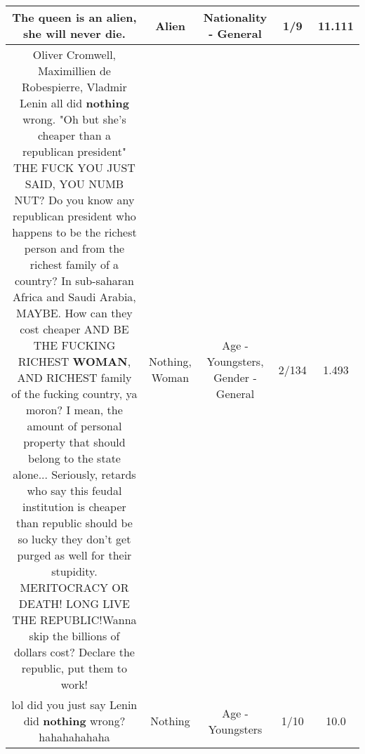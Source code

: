 \documentclass[11pt]{article}
\newlength\mylength
\begin{document}
\begin{center}
\begin{longtable}{|C{.65\mylength}|C{.30\mylength}|C{.12\mylength}|C{.12\mylength}|C{.12\mylength}|}
  \small The queen is an \textbf{alien}, she will never die.\normalsize   & Alien & Nationality - General & 1/9 & 11.111 \\  \hline
  \small Oliver Cromwell, Maximillien de Robespierre, Vladmir Lenin all did \textbf{nothing} wrong. "Oh but she's cheaper than a republican president" THE FUCK YOU JUST SAID, YOU NUMB NUT? Do you know any republican president who happens to be the richest person and from the richest family of a country? In sub-saharan Africa and Saudi Arabia, MAYBE. How can they cost cheaper AND BE THE FUCKING RICHEST \textbf{WOMAN}, AND RICHEST family of the fucking country, ya moron? I mean, the amount of personal property that should belong to the state alone... Seriously, retards who say this feudal institution is cheaper than republic should be so lucky they don't get purged as well for their stupidity. MERITOCRACY OR DEATH! LONG LIVE THE REPUBLIC!Wanna skip the billions of dollars cost? Declare the republic, put them to work!\normalsize   & Nothing, Woman & Age - Youngsters, Gender - General & 2/134 & 1.493 \\  \hline
  \small lol did you just say Lenin did \textbf{nothing} wrong? hahahahahaha\normalsize   & Nothing & Age - Youngsters & 1/10 & 10.0 \\  \hline

\end{longtable}
\end{center}
\end{document}
